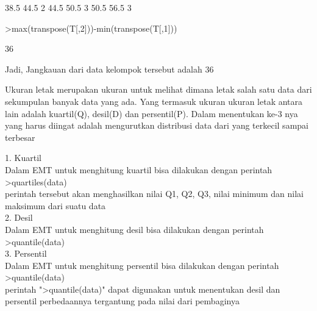 \documentclass[a4paper,10pt]{article}
\begin{document}
\begin{eulernotebook}
\begin{eulercomment}
\begin{eulercomment}
\begin{eulercomment}
\begin{eulercomment}
\begin{eulercomment}
\begin{eulercomment}
\begin{eulercomment}
\begin{eulercomment}
\begin{eulercomment}
\begin{eulercomment}
\begin{euleroutput}
         38.5      44.5         2
         44.5      50.5         3
         50.5      56.5         3
\end{euleroutput}
\begin{eulerprompt}
>max(transpose(T[,2]))-min(transpose(T[,1]))
\end{eulerprompt}
\begin{euleroutput}
  36
\end{euleroutput}
\begin{eulercomment}
Jadi, Jangkauan dari data kelompok tersebut adalah 36
\end{eulercomment}
\begin{eulercomment}
Ukuran letak merupakan ukuran untuk melihat dimana letak salah satu
data dari sekumpulan banyak data yang ada. Yang termasuk ukuran ukuran
letak antara lain adalah kuartil(Q), desil(D) dan persentil(P). Dalam
menentukan ke-3 nya yang harus diingat adalah mengurutkan distribusi
data dari yang terkecil sampai terbesar

1. Kuartil\\
Dalam EMT untuk menghitung kuartil bisa dilakukan dengan perintah\\
\textgreater{}quartiles(data)\\
perintah tersebut akan menghasilkan nilai Q1, Q2, Q3, nilai minimum
dan nilai maksimum dari suatu data\\
2. Desil\\
Dalam EMT untuk menghitung desil bisa dilakukan dengan perintah\\
\textgreater{}quantile(data)\\
3. Persentil\\
Dalam EMT untuk menghitung persentil bisa dilakukan dengan perintah\\
\textgreater{}quantile(data)\\
perintah "\textgreater{}quantile(data)" dapat digunakan untuk menentukan desil dan
persentil perbedaannya tergantung pada nilai dari pembaginya


\end{eulercomment}
\end{eulercomment}
\end{eulercomment}
\end{eulercomment}
\end{eulercomment}
\end{eulercomment}
\end{eulercomment}
\end{eulercomment}
\end{eulercomment}
\end{eulercomment}
\end{eulercomment}
\end{eulernotebook}
\end{document}
